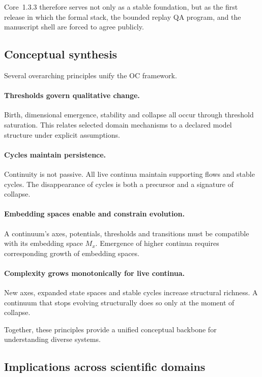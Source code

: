Core~1.3.3 therefore serves not only as a stable foundation, but as the first
release in which the formal stack, the bounded replay QA program, and the
manuscript shell are forced to agree publicly.

\subsection{Conceptual synthesis}

Several overarching principles unify the OC framework.

\paragraph{Thresholds govern qualitative change.}
Birth, dimensional emergence, stability and collapse all occur through threshold saturation.
This relates selected domain mechanisms to a declared model structure under explicit assumptions.

\paragraph{Cycles maintain persistence.}
Continuity is not passive.
All live continua maintain supporting flows and stable cycles.
The disappearance of cycles is both a precursor and a signature of collapse.

\paragraph{Embedding spaces enable and constrain evolution.}
A continuum’s axes, potentials, thresholds and transitions must be compatible with its embedding space \(M_x\).
Emergence of higher continua requires corresponding growth of embedding spaces.

\paragraph{Complexity grows monotonically for live continua.}
New axes, expanded state spaces and stable cycles increase structural richness.
A continuum that stops evolving structurally does so only at the moment of collapse.

Together, these principles provide a unified conceptual backbone for understanding diverse systems.

\subsection{Implications across scientific domains}

